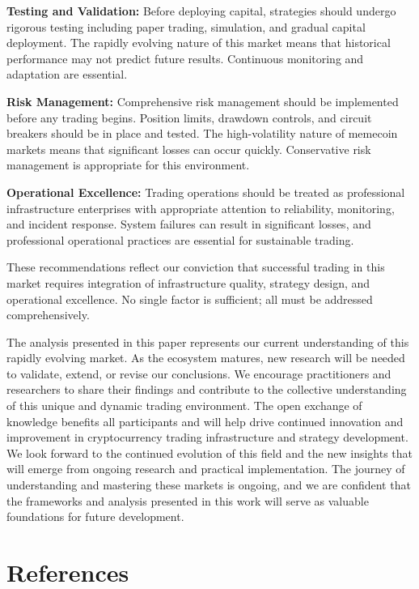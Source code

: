 \documentclass[12pt,a4paper]{article}
\begin{document}
\textbf{Testing and Validation:} Before deploying capital, strategies should undergo rigorous testing including paper trading, simulation, and gradual capital deployment. The rapidly evolving nature of this market means that historical performance may not predict future results. Continuous monitoring and adaptation are essential.

\textbf{Risk Management:} Comprehensive risk management should be implemented before any trading begins. Position limits, drawdown controls, and circuit breakers should be in place and tested. The high-volatility nature of memecoin markets means that significant losses can occur quickly. Conservative risk management is appropriate for this environment.

\textbf{Operational Excellence:} Trading operations should be treated as professional infrastructure enterprises with appropriate attention to reliability, monitoring, and incident response. System failures can result in significant losses, and professional operational practices are essential for sustainable trading.

These recommendations reflect our conviction that successful trading in this market requires integration of infrastructure quality, strategy design, and operational excellence. No single factor is sufficient; all must be addressed comprehensively.

The analysis presented in this paper represents our current understanding of this rapidly evolving market. As the ecosystem matures, new research will be needed to validate, extend, or revise our conclusions. We encourage practitioners and researchers to share their findings and contribute to the collective understanding of this unique and dynamic trading environment. The open exchange of knowledge benefits all participants and will help drive continued innovation and improvement in cryptocurrency trading infrastructure and strategy development. We look forward to the continued evolution of this field and the new insights that will emerge from ongoing research and practical implementation. The journey of understanding and mastering these markets is ongoing, and we are confident that the frameworks and analysis presented in this work will serve as valuable foundations for future development.

\section{References}
\end{document}
